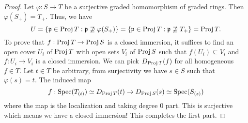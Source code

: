 \documentclass[]{pcmi}
\theoremstyle{plain}
\theoremstyle{definition}
\theoremstyle{remark}
\begin{document}
\begin{proof}
    Let $\varphi : S \to T$ be a surjective graded homomorphism of graded rings. Then $\varphi(S_+) = T_+$. Thus, we have 
    \[
        U = \{ \mathfrak{p} \in \operatorname{Proj} T : \mathfrak{p} \not\supseteq \varphi(S_+)\} = \{ \mathfrak{p} \in \operatorname{Proj} T : \mathfrak{p} \not\supseteq T_+ \} = \operatorname{Proj} T. 
    \]
    To prove that $f : \operatorname{Proj} T \to \operatorname{Proj} S$ is a closed immersion, it suffices to find an open cover $U_i$ of $\operatorname{Proj} T$ with open sets $V_i$ of $\operatorname{Proj} S$ such that $f(U_i) \subseteq V_i$ and $f : U_i \to V_i$ is a closed immersion. We can pick $D_{\operatorname{Proj} T}(f)$ for all homogeneous $f \in T$. Let $t \in T$ be arbitrary, from surjectivity we have $s \in S$ such that $\varphi(s) = t$. The induced map 
    \[
        f : \operatorname{Spec} (T_{(t)}) \simeq D_{\operatorname{Proj} T}(t) \to D_{\operatorname{Proj} S}(s) \simeq \operatorname{Spec} (S_{(s)})
    \]
    where the map is the localization and taking degree $0$ part. This is surjective which means we have a closed immersion! This completes the first part. 
    
\end{proof}
%    
%
%
%
%             
%   
%
%  

\bibspread



\vfill\eject
\end{document}
